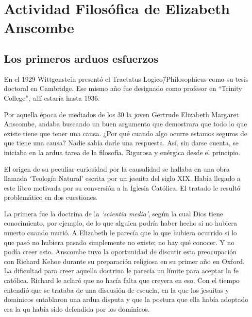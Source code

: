 \section{Actividad Filosófica de Elizabeth Anscombe}

\subsection{Los primeros arduos esfuerzos}

En el 1929 Wittgenstein presentó el Tractatus Logico\=/Philosophicus como su
tesis doctoral en Cambridge. Ese mismo año fue designado como profesor en
``Trinity College'', allí estaría hasta 1936.


Por aquella época de mediados de los 30 la joven Gertrude Elizabeth Margaret
Anscombe, andaba buscando un buen argumento que demostrara que todo lo que
existe tiene que tener una causa. ¿Por qué cuando algo ocurre estamos seguros de
que tiene una causa? Nadie sabía darle una respuesta.\autocite[cf.~][p.~vii
]{anscombe1981metaphysicsintro} Así, sin darse cuenta, se iniciaba en la ardua
tarea de la filosofía. Rigurosa y enérgica desde el principio.

El origen de su peculiar curiosidad por la causalidad se hallaba en una obra
llamada `Teología Natural' escrita por un jesuita del siglo XIX. Había llegado a
este libro motivada por su conversión a la Iglesia
Católica.\autocite[cf.~][p.~vii]{anscombe1981metaphysicsintro} El tratado le
resultó problemático en dos cuestiones.

La primera fue la doctrina de la \emph{`scientia media'}, según la cual Dios
tiene conocimiento, por ejemplo, de lo que alguien podría haber hecho si no
hubiera muerto cuando murió. A Elizabeth le parecía que lo que hubiera ocurrido
si lo que pasó no hubiera pasado simplemente no existe; no hay qué conocer. Y no
podía creer esto. Anscombe tuvo la oportunidad de discutir esta preocupación con
Richard Kehoe durante su preparación religiosa en su primer año en Oxford. La
dificultad para creer aquella doctrina le parecía un límite para aceptar la fe
católica. Richard le aclaró que no hacía falta que creyera en eso. Con el tiempo
entendió que se trataba de una discusión de escuela, en la que los jesuítas y
dominicos entablaron una ardua disputa y que la postura que ella había adoptado
era la qu había sido defendida por los
dominicos.\autocite[cf.~][p.~vii]{anscombe1981metaphysicsintro}

